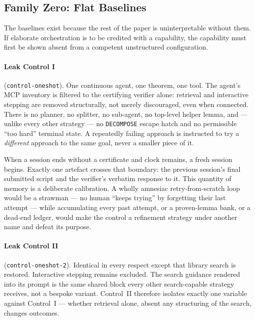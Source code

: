 \documentclass[12pt, a4paper]{article}
\begin{document}
\subsection{Family Zero: Flat Baselines}
\label{sec:controls}

The baselines exist because the rest of the paper is uninterpretable without
them. If elaborate orchestration is to be credited with a capability, the
capability must first be shown absent from a competent unstructured
configuration.

\paragraph{Leak Control I} (\texttt{control-oneshot}). One continuous agent,
one theorem, one tool. The agent's MCP inventory is filtered to the
certifying verifier alone: retrieval and interactive stepping are removed
structurally, not merely discouraged, even when connected. There is no
planner, no splitter, no sub-agent, no top-level helper lemma, and --- unlike
every other strategy --- no \texttt{DECOMPOSE} escape hatch and no
permissible ``too hard'' terminal state. A repeatedly failing approach is
instructed to try a \emph{different} approach to the same goal, never a
smaller piece of it.

When a session ends without a certificate and clock remains, a fresh session
begins. Exactly one artefact crosses that boundary: the previous session's
final submitted script and the verifier's verbatim response to it. This
quantity of memory is a deliberate calibration. A wholly amnesiac
retry-from-scratch loop would be a strawman --- no human ``keeps trying''
by forgetting their last attempt --- while accumulating every past attempt,
or a proven-lemma bank, or a dead-end ledger, would make the control a
refinement strategy under another name and defeat its purpose.

\paragraph{Leak Control II} (\texttt{control-oneshot-2}). Identical in every
respect except that library search is restored. Interactive stepping remains
excluded. The search guidance rendered into its prompt is the same shared
block every other search-capable strategy receives, not a bespoke variant.
Control~II therefore isolates exactly one variable against Control~I ---
whether retrieval alone, absent any structuring of the search, changes
outcomes.
\end{document}

